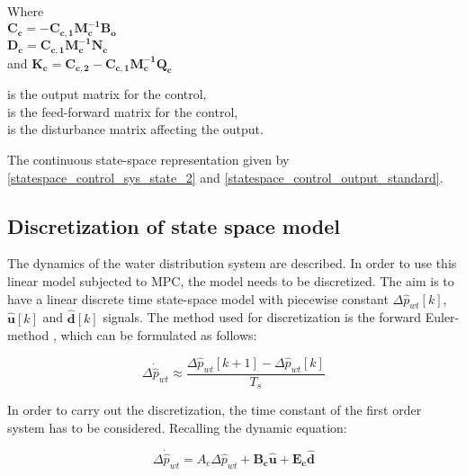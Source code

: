 \begin{minipage}[t]{0.40\textwidth}
Where\\
\hspace*{8mm} $\bm{C_c} = -\bm{C_{c,1}}\bm{M_c^{-1}}\bm{B_o} $ \\
\hspace*{8mm} $\bm{D_c} =  \bm{C_{c,1}}\bm{M_c^{-1}}\bm{N_c} $ \\
and \hspace*{0.7mm} $\bm{K_c} = \bm{C_{c,2}} -\bm{C_{c,1}}\bm{M_c^{-1}}\bm{Q_c} $
\end{minipage}
\begin{minipage}[t]{0.58\textwidth}
\vspace*{1mm}
is the output matrix for the control, \\
is the feed-forward matrix for the control, \\
is the disturbance matrix affecting the output.
\end{minipage} 

The continuous state-space representation given by \eqref{statespace_control_sys_state_2} and \eqref{statespace_control_output_standard}.

\subsection{Discretization of state space model}
 \label{discrete_SS}
 
The dynamics of the water distribution system are described. In order to use this linear model subjected to MPC, the model needs to be discretized. The aim is to have a linear discrete time state-space model with piecewise constant $\Delta \hat{p}_{wt}[k]$, $\bm{\hat{u}}[k]$ and $\bm{\hat{d}}[k]$ signals. The method used for discretization is the forward Euler-method \citep{franklin1994feedback}, which can be formulated as follows:

\begin{equation}
\Delta \dot{\hat{p}}_{wt} \approx  \frac{\Delta \hat{p}_{wt}[k+1] - \Delta\hat{p}_{wt}[k]}{T_s} 
 \label{statespace_discrete_state1}
\end{equation}

In order to carry out the discretization, the time constant of the first order system has to be considered. Recalling the dynamic equation:

\begin{equation}
\Delta \dot{\hat{p}}_{wt} = A_c \Delta \hat{p}_{wt}  + \bm{B_c} \bm{\hat{u}} + \bm{E_c} \bm{\hat{d}} 
\label{eq:cons_model_}
\end{equation}

